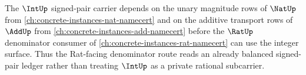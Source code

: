 \begin{proposition}
\label{prop:int-nat-add-rat-sibling-dependency-surface}
The $\IntUp$ signed-pair carrier depends on the unary magnitude rows of $\NatUp$ from \autoref{ch:concrete-instances-nat-namecert} and on the additive transport rows of $\AddUp$ from \autoref{ch:concrete-instances-add-namecert} before the $\RatUp$ denominator consumer of \autoref{ch:concrete-instances-rat-namecert} can use the integer surface. Thus the Rat-facing denominator route reads an already balanced signed-pair ledger rather than treating $\IntUp$ as a private rational subcarrier.
\end{proposition}
